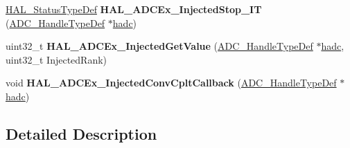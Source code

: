 \begin{DoxyCompactItemize}
\item 
\hypertarget{group___a_d_c_ex___exported___functions___group1_gae032f41136f4dc4b3f3c2476b96a21f5}{\hyperlink{stm32l1xx__hal__def_8h_a63c0679d1cb8b8c684fbb0632743478f}{H\-A\-L\-\_\-\-Status\-Type\-Def} {\bfseries H\-A\-L\-\_\-\-A\-D\-C\-Ex\-\_\-\-Injected\-Stop\-\_\-\-I\-T} (\hyperlink{struct_a_d_c___handle_type_def}{A\-D\-C\-\_\-\-Handle\-Type\-Def} $\ast$\hyperlink{stm32l1xx__it_8c_a62fcafba91cf315db7e0e0c8f22c656f}{hadc})}\label{group___a_d_c_ex___exported___functions___group1_gae032f41136f4dc4b3f3c2476b96a21f5}

\item 
\hypertarget{group___a_d_c_ex___exported___functions___group1_ga7996668b61263f91c76d5f55551f3a07}{uint32\-\_\-t {\bfseries H\-A\-L\-\_\-\-A\-D\-C\-Ex\-\_\-\-Injected\-Get\-Value} (\hyperlink{struct_a_d_c___handle_type_def}{A\-D\-C\-\_\-\-Handle\-Type\-Def} $\ast$\hyperlink{stm32l1xx__it_8c_a62fcafba91cf315db7e0e0c8f22c656f}{hadc}, uint32\-\_\-t Injected\-Rank)}\label{group___a_d_c_ex___exported___functions___group1_ga7996668b61263f91c76d5f55551f3a07}

\item 
\hypertarget{group___a_d_c_ex___exported___functions___group1_gaed7815e8b636ff1c1f456ecbaffe1942}{void {\bfseries H\-A\-L\-\_\-\-A\-D\-C\-Ex\-\_\-\-Injected\-Conv\-Cplt\-Callback} (\hyperlink{struct_a_d_c___handle_type_def}{A\-D\-C\-\_\-\-Handle\-Type\-Def} $\ast$\hyperlink{stm32l1xx__it_8c_a62fcafba91cf315db7e0e0c8f22c656f}{hadc})}\label{group___a_d_c_ex___exported___functions___group1_gaed7815e8b636ff1c1f456ecbaffe1942}

\end{DoxyCompactItemize}


\subsection{Detailed Description}
